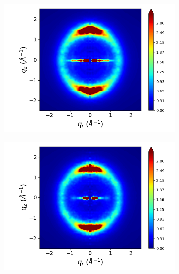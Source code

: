 \documentclass[journal=jpcbfk,manusciprt=article]{achemso}
\begin{document}
\begin{figure}[!htb]
  \begin{subfigure}{0.3\linewidth}
  	\centering
  	\includegraphics[width=\textwidth]{staggered_rzplot_norestraints.png} %
  	\caption{}\label{fig:staggered_rzplot_norestraints} 
  \end{subfigure}
  \begin{subfigure}{0.3\linewidth}
  	\centering
  	\includegraphics[width=\textwidth]{rotated_monomers_rzplot_norestraints.png}
  	\caption{}\label{fig:rotated_monomers_rzplot_norestraints}

\end{subfigure}
\end{figure}
\end{document}
